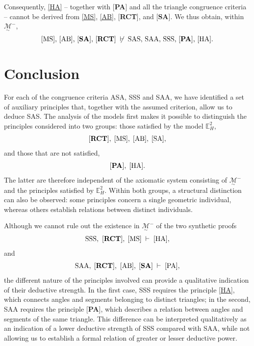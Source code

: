 \documentclass[11pt,a4paper]{article}
\theoremstyle{definition}
\theoremstyle{remark}
\numberwithin{equation}{section}
\newcommand{\MG}{\underset{\sim}{\mathcal{M}}} %
\begin{document}
Consequently, \ref{HA} -- together with [\textbf{PA}] and all the triangle congruence criteria
-- cannot be derived from \ref{MS}, \ref{AB}, [\textbf{RCT}], and [\textbf{SA}]. We thus
obtain, within $\MG^{-}$,
\begin{equation}\label{PEN_IND}
\textrm{\ref{MS}, \ref{AB}, [\textbf{SA}], [\textbf{RCT}]}
\;\not\vdash\;
\textrm{SAS, SAA, SSS, [\textbf{PA}], \ref{HA}}.
\end{equation}
\section{Conclusion}
For each of the congruence criteria ASA, SSS and SAA, we have identified a set of auxiliary principles that, together with the assumed criterion, allow us to deduce SAS.
The analysis of the models first makes it possible to distinguish the principles considered into two groups: those satisfied by the model $\mathbb{E}_{H}^{2}$,
\begin{equation*}
\textrm{[\textbf{RCT}]},\; \ref{MS},\; \ref{AB},\; \ref{SA},
\end{equation*}
and those that are not satisfied,
\begin{equation*}
\textrm{[\textbf{PA}]},\; \ref{HA}.
\end{equation*}
The latter are therefore independent of the axiomatic system consisting of $\MG^{-}$ and the principles satisfied by $\mathbb{E}_{H}^{2}$. Within both groups, a structural distinction can also be observed: some principles concern a single geometric individual, whereas others establish relations between distinct individuals.

Although we cannot rule out the existence in $\MG^{-}$ of the two synthetic proofs
\begin{equation*}
\textrm{SSS},\ [\textbf{RCT}],\; \ref{MS}\;\vdash\;\ref{HA},
\end{equation*}
and
\begin{equation*}
\textrm{SAA},\; [\textbf{RCT}],\ \ref{AB},\; [\textbf{SA}]\;\vdash\;\textrm{[PA]},
\end{equation*}
the different nature of the principles involved can provide a qualitative indication of their deductive strength. In the first case, SSS requires the principle \ref{HA}, which connects angles and segments belonging to distinct triangles; in the second, SAA requires the principle [\textbf{PA}], which describes a relation between angles and segments of the same triangle. This difference can be interpreted qualitatively as an indication of a lower deductive strength of SSS compared with SAA, while not allowing us to establish a formal relation of greater or lesser deductive power.
\end{document}
